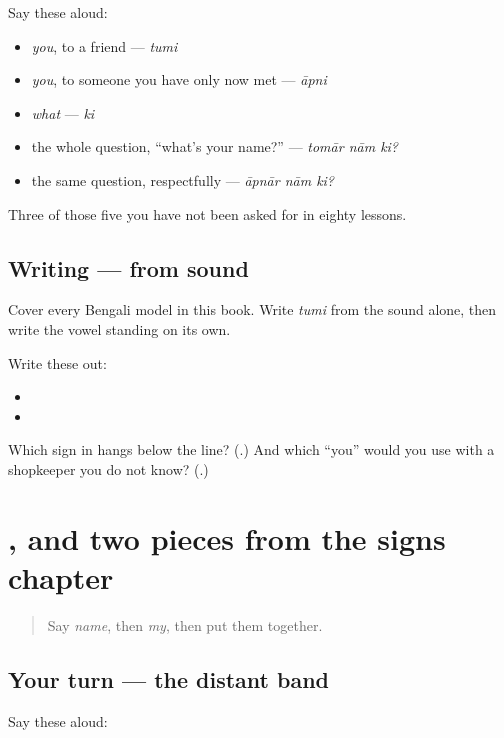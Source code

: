 Say these aloud:

\begin{itemize}
\raggedright
  \item \emph{you}, to a friend — \emph{tumi}
  \item \emph{you}, to someone you have only now met — \emph{āpni}
  \item \emph{what} — \emph{ki}
  \item the whole question, \textquotedblleft{}what's your name?\textquotedblright{} — \emph{tomār nām ki?}
  \item the same question, respectfully — \emph{āpnār nām ki?}
\end{itemize}

Three of those five you have not been asked for in eighty lessons.

\subsection*{Writing — from sound}
Cover every Bengali model in this book. Write \emph{tumi} from the sound alone, then write the vowel \textbf{} standing on its own.

Write these out:

\begin{itemize}
\raggedright
  \item {}
  \item {}
\end{itemize}

\begin{tcolorbox}[breakable,colback=teal!4,colframe=teal!35!black,title={Before you move on}]
Which sign in \textbf{} hangs below the line? (\textbf{}.) And which \textquotedblleft{}you\textquotedblright{} would you use with a shopkeeper you do not know? (\textbf{}.)
\end{tcolorbox}
\section[Practice]{, and two pieces from the signs chapter}

\label{lesson:BN-R01-ta-u-again}



\begin{quote}
Say \emph{name}, then \emph{my}, then put them together.
\end{quote}

\subsection*{Your turn — the distant band}
Say these aloud:

